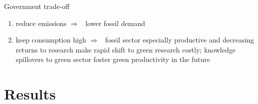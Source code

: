 \documentclass[11pt,aspectratio=169]{beamer}
\newcommand{\ar}{$\Rightarrow$ \ }
\begin{document}
\begin{frame}{Government trade-off}
	
	\begin{enumerate}[<+-| alert@+>]
		\item reduce emissions \ar lower fossil demand
		\vspace{3mm}
		\item keep consumption high \ar fossil sector especially productive and decreasing returns to research make rapid shift to green research costly; knowledge spillovers to green sector foster green productivity in the future
	\end{enumerate}
\end{frame}


\section{Results}
\end{document}
